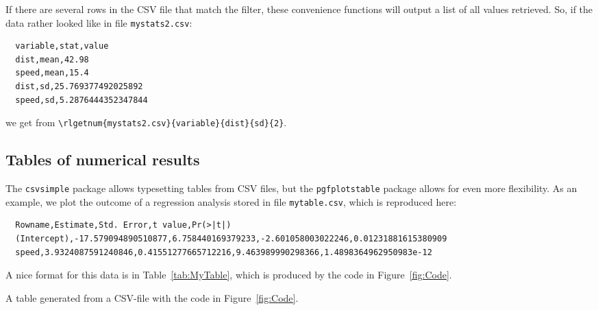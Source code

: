 \documentclass[fleqn,reqno,10pt]{article}
\newcommand{\datafoldername}{R_data_4_TeX}
\newcommand{\rlnum}[2]{\num[output-decimal-marker={.},
                             exponent-product = \cdot,
                             round-mode=places,
                             round-precision=#2,
                             group-digits=false]{#1}}
\newcommand{\rlgetnum}[5]{\csvreader[filter strcmp={\mykey}{#3},
             late after line = {{,}\ }, late after last line = {{}}]
            {\datafoldername/#1}{#2=\mykey,#4=\myvalue}{\rlnum{\myvalue}{#5}}}
\begin{document}
If there are several rows in the CSV file that match the filter, these convenience functions
will output a list of all values retrieved. So, if the data rather looked like in file
\texttt{mystats2.csv}:
\begin{verbatim}
  variable,stat,value        
  dist,mean,42.98            
  speed,mean,15.4            
  dist,sd,25.769377492025892 
  speed,sd,5.2876444352347844
\end{verbatim}
we get \rlgetnum{mystats2.csv}{variable}{dist}{sd}{2} from \verb|\rlgetnum{mystats2.csv}{variable}{dist}{sd}{2}|. 

\subsection*{Tables of numerical results}

The \texttt{csvsimple} package allows typesetting tables from CSV files, but the
\texttt{pgfplotstable} package allows for even more flexibility. As an example, we plot the
outcome of a regression analysis stored in file \texttt{mytable.csv}, which is reproduced here:
\begin{verbatim}
  Rowname,Estimate,Std. Error,t value,Pr(>|t|)                                         
  (Intercept),-17.579094890510877,6.758440169379233,-2.601058003022246,0.01231881615380909
  speed,3.9324087591240846,0.41551277665712216,9.463989990298366,1.4898364962950983e-12
\end{verbatim}
A nice format for this data is in Table~\ref{tab:MyTable}, which is produced by the code in Figure~\ref{fig:Code}.

\begin{center}
  \begin{table}[h]
    \centering


    \caption{A table generated from a CSV-file with the code in Figure~\ref{fig:Code}.}
    \label{tab:MyTable}
  \end{table}
\end{center}
\end{document}
